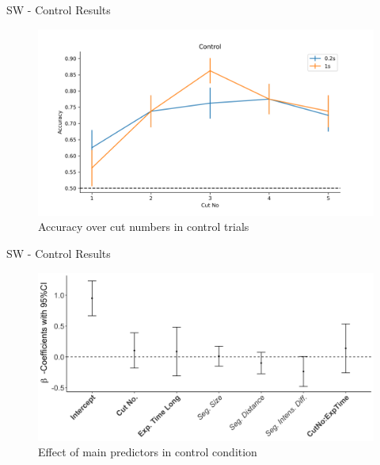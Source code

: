 \documentclass[10pt,xcolor=svgnames]{beamer} %
\begin{document}
\begin{frame}{SW - Control Results}
    \begin{figure}
        \hspace*{-1cm} 
        \centering
        \includegraphics[width = 1.1\textwidth]{pictures/sw_control.png}
        \caption{Accuracy over cut numbers in control trials}
        \label{fig:sw_cont_acc}
    \end{figure}
\end{frame}

\begin{frame}{SW - Control Results}
    \begin{figure}
        \hspace*{-1cm} 
        \centering
        \includegraphics[width = \textwidth]{pictures/sw_cont_coefficients_othrs_tgthr.png}
        \caption{Effect of main predictors in control condition}
        \label{fig:sw_coefficients_con_main}
    \end{figure}
\end{frame}
\end{document}
